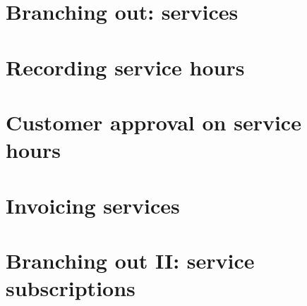 

% 

\chapter{Branching out: services}



\chapter{Recording service hours}

\chapter{Customer approval on service hours}

\chapter{Invoicing services}

\chapter{Branching out II: service subscriptions}


